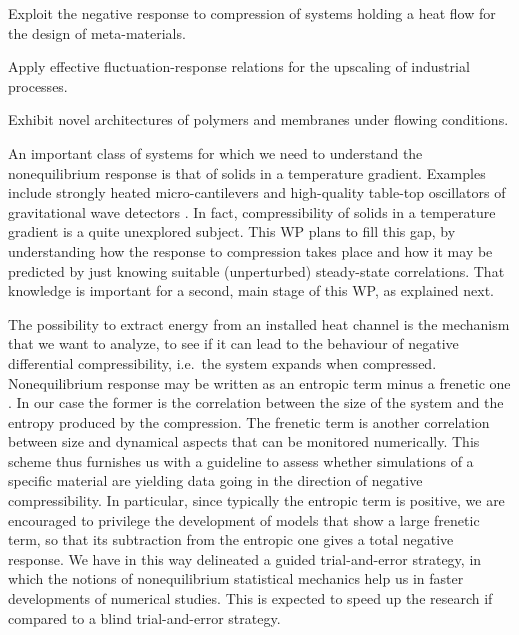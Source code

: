 \begin{workpackage}[id=WPcompress,wphases=0-48,
  short=Nonequilibrium compressibility, %
  title=Nonequilibrium compressibility, %
  lead=UNIPD,
  UNIPDRM=72,
  KULRM=12]

\newrefsection

\begin{wpobjectives}
  \begin{compactitem}
  \item Exploit the negative response to compression of systems holding a heat flow for the design of meta-materials.
  \item Apply effective fluctuation-response relations for the upscaling of industrial processes.
  \item Exhibit novel architectures of polymers and membranes under flowing conditions.
  \end{compactitem}
\end{wpobjectives}

\begin{wpdescription}

An important class of systems for which we need to understand the nonequilibrium response is that of solids 
in a temperature gradient. Examples include strongly
heated micro-cantilevers \cite{AGBB15} and high-quality table-top oscillators of gravitational wave detectors \cite{Cet13}.
In fact, compressibility of solids in a temperature gradient is a quite unexplored subject.
This WP plans to fill this gap, by understanding how the response to compression takes place and how it
may be predicted by just knowing suitable (unperturbed) steady-state correlations.
That knowledge is important for a second, main stage of this WP, as explained next.


The possibility to extract energy from an installed heat channel is the mechanism that we want to
analyze, to see if it can lead to the behaviour of negative differential compressibility,
i.e.~the system expands when compressed. 
Nonequilibrium response may be written as an entropic term minus a frenetic one \cite{BMW09}.
In our case the former is the correlation between the size of the system and the entropy produced by the compression.
The frenetic term is another correlation between size and dynamical aspects that can be monitored numerically.
This scheme thus furnishes us with a guideline to assess whether simulations of a specific material are yielding data 
going in the direction of negative compressibility. In particular, since typically the entropic term is positive, we
are encouraged to privilege the development of models that show a large frenetic term, so that its subtraction from
the entropic one gives a total negative response.
We have in this way delineated a guided trial-and-error strategy, in which the notions of 
nonequilibrium statistical mechanics help us in faster developments of numerical studies. This is expected to
speed up the research if compared to a blind trial-and-error strategy.



\end{wpdescription}
\end{workpackage}
